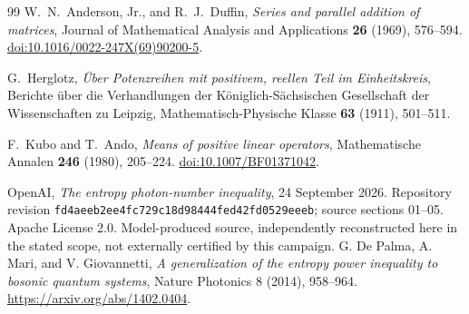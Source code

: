 \documentclass[11pt]{article}
\theoremstyle{remark}\newtheorem{remark}[theorem]{Remark}
\begin{document}
\begin{thebibliography}{99}
W.~N.~Anderson, Jr., and R.~J.~Duffin,
\emph{Series and parallel addition of matrices},
Journal of Mathematical Analysis and Applications \textbf{26} (1969), 576--594.
\href{https://doi.org/10.1016/0022-247X(69)90200-5}{\mbox{doi:10.1016/0022-247X(69)90200-5}}.

G.~Herglotz,
\emph{\"Uber Potenzreihen mit positivem, reellen Teil im Einheitskreis},
Berichte \"uber die Verhandlungen der K\"oniglich-S\"achsischen Gesellschaft
der Wissenschaften zu Leipzig, Mathematisch-Physische Klasse
\textbf{63} (1911), 501--511.

F.~Kubo and T.~Ando,
\emph{Means of positive linear operators},
Mathematische Annalen \textbf{246} (1980), 205--224.
\href{https://doi.org/10.1007/BF01371042}{doi:10.1007/BF01371042}.

 OpenAI, \emph{The entropy photon-number inequality}, 24 September 2026. Repository revision \texttt{fd4aeeb2ee4fc729c18d98444fed42fd0529eeeb}\allowbreak; source sections 01--05. Apache License 2.0. Model-produced source, independently reconstructed here in the stated scope, not externally certified by this campaign.
 G. De Palma, A. Mari, and V. Giovannetti, \emph{A generalization of the entropy power inequality to bosonic quantum systems}, Nature Photonics 8 (2014), 958--964. \url{https://arxiv.org/abs/1402.0404}.
\end{thebibliography}
\end{document}
